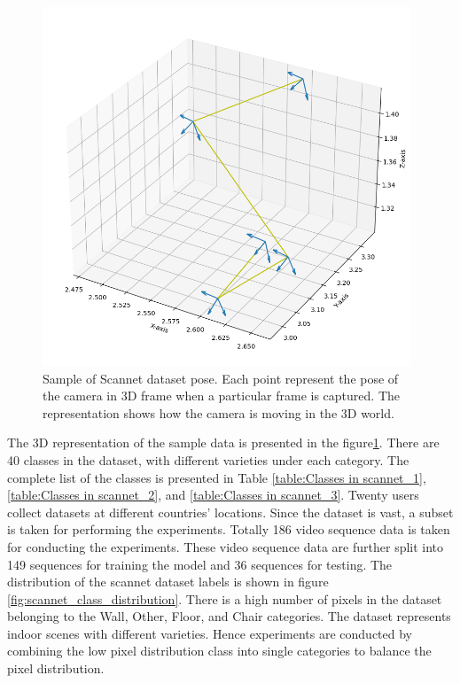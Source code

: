 	\begin{figure}
		\centering
		\includegraphics[width=11cm]{images/pose_viz_scannet.png}
		\caption{Sample of Scannet dataset pose. Each point represent the pose of the camera in 3D frame when a particular frame is captured. The representation shows how the camera is moving in the 3D world.}
		\label{fig:sample_pose_scannet}
	\end{figure}
	
	The 3D representation of the sample data is presented in the figure\ref{fig:sample_pose_scannet}. There are 40 classes in the dataset, with different varieties under each category. The complete list of the classes is presented in Table \ref{table:Classes in scannet_1}, \ref{table:Classes in scannet_2}, and \ref{table:Classes in scannet_3}. Twenty users collect datasets at different countries' locations. Since the dataset is vast, a subset is taken for performing the experiments. Totally 186 video sequence data is taken for conducting the experiments. These video sequence data are further split into 149 sequences for training the model and 36 sequences for testing. The distribution of the scannet dataset labels is shown in figure \ref{fig:scannet_class_distribution}. There is a high number of pixels in the dataset belonging to the Wall, Other, Floor, and Chair categories. The dataset represents indoor scenes with different varieties. Hence experiments are conducted by combining the low pixel distribution class into single categories to balance the pixel distribution. 
	
